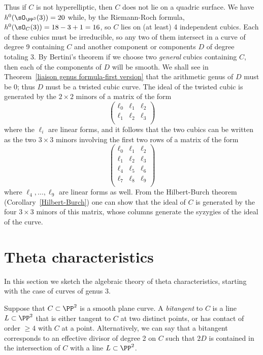 Thus if $C$ is not hyperelliptic, then $C$ does not lie on a quadric surface. We have $h^0(\sO_{\PP^3}(3)) = 20$ while, by the Riemann-Roch formula, $h^0(\sO_C(3)) = 18-3+1= 16$, so $C$ lies on (at least) 4 independent cubics. Each of these cubics must be irreducible, so any two of them
intersect in a curve of degree 9 containing $C$ and another component or components $D$ of degree totaling 3. By Bertini's theorem
if we choose two \emph{general} cubics containing $C$, then each of the components of $D$ will be smooth. We shall see in Theorem~\ref{liaison genus formula-first version} that the arithmetic genus of $D$ must be 0; thus $D$ must be a twisted cubic curve. The ideal of the twisted cubic is generated by the $2\times 2$ minors of a matrix of the form
$$
\begin{pmatrix}
 \ell_0& \ell_1&\ell_2\\
 \ell_1& \ell_2&\ell_3\\
\end{pmatrix}
$$
where the $\ell_i$ are linear forms,
and it follows that the two cubics can be written as the two $3\times 3$ minors involving the first two rows of  a matrix of the form
$$
\begin{pmatrix}\label{hilbert-burch matrix}
 \ell_0& \ell_1&\ell_2\\
 \ell_1& \ell_2&\ell_3\\
\ell_4& \ell_5&\ell_6\\
 \ell_7& \ell_8&\ell_9\\
\end{pmatrix}
$$
where $\ell_4,\dots,\ell_9$ are linear forms as well.
From the Hilbert-Burch theorem (Corollary~\ref{Hilbert-Burch}) one can show that the ideal of $C$ is generated by the four $3\times 3$ minors of this matrix, whose columns generate
the syzygies of the ideal of the curve.


\section{Theta characteristics}

In this section we sketch the algebraic theory of theta characteristics, starting with the case of curves of genus 3.

Suppose that $C \subset \PP^2$ is a smooth plane curve. A \emph{bitangent} to $C$ is a line $L \subset \PP^2$ that is either tangent to $C$ at two distinct points, or has contact of order $\geq 4$ with $C$ at a point. Alternatively, we can say that a bitangent  corresponds to an effective divisor of degree 2 on $C$ such that $2D$ is contained in the intersection of $C$ with a line $L \subset \PP^2$.

